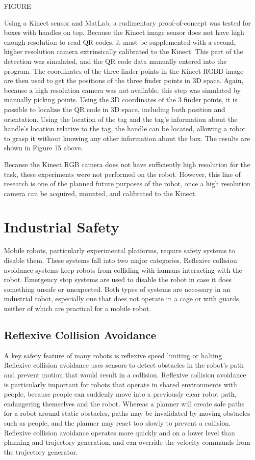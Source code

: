 \documentclass[]{cwru} %
\begin{document}
FIGURE

Using a Kinect sensor and MatLab, a rudimentary proof-of-concept was
tested for boxes with handles on top. Because the Kinect image sensor
does not have high enough resolution to read QR codes, it must be
supplemented with a second, higher resolution camera extrinsically
calibrated to the Kinect. This part of the detection was simulated, and
the QR code data manually entered into the program. The coordinates of
the three finder points in the Kinect RGBD image are then used to get
the positions of the three finder points in 3D space. Again, because a
high resolution camera was not available, this step was simulated by
manually picking points. Using the 3D coordinates of the 3 finder
points, it is possible to localize the QR code in 3D space, including
both position and orientation. Using the location of the tag and the
tag's information about the handle's location relative to the tag, the
handle can be located, allowing a robot to grasp it without knowing any
other information about the box. The results are shown in Figure 15
above.

Because the Kinect RGB camera does not have sufficiently high resolution
for the task, these experiments were not performed on the robot.
However, this line of research is one of the planned future purposes of
the robot, once a high resolution camera can be acquired, mounted, and
calibrated to the Kinect.

\chapter{Industrial Safety}

Mobile robots, particularly experimental platforms, require safety
systems to disable them. These systems fall into two major categories.
Reflexive collision avoidance systems keep robots from colliding with
humans interacting with the robot. Emergency stop systems are used to
disable the robot in case it does something unsafe or unexpected. Both
types of systems are necessary in an industrial robot, especially one
that does not operate in a cage or with guards, neither of which are
practical for a mobile robot.

\section{Reflexive Collision Avoidance}

A key safety feature of many robots is reflexive speed limiting or
halting. Reflexive collision avoidance uses sensors to detect obstacles
in the robot's path and prevent motion that would result in a collision.
Reflexive collision avoidance is particularly important for robots that
operate in shared environments with people, because people can suddenly
move into a previously clear robot path, endangering themselves and the
robot. Whereas a planner will create safe paths for a robot around
static obstacles, paths may be invalidated by moving obstacles such as
people, and the planner may react too slowly to prevent a collision.
Reflexive collision avoidance operates more quickly and on a lower level
than planning and trajectory generation, and can override the velocity
commands from the trajectory generator.
\end{document}
